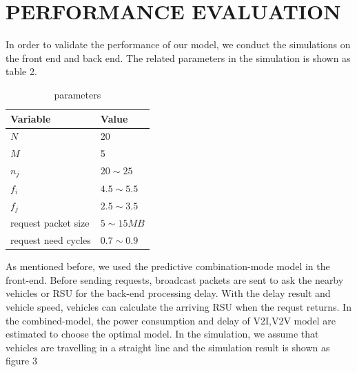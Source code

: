 \documentclass[journal]{IEEEtran}
\begin{document}
\section{PERFORMANCE EVALUATION}
In order to validate the performance of our model, we conduct the simulations on the front end and back end. The related parameters in the simulation is shown as table 2.
\begin{table}[h]
	\centering
	\begin{tabular}{p{3cm}p{3cm}}
	\hline
	Variable & Value \\\hline   
	$N$             & 20\\
	$M$             & 5\\
	$n_j$           & $20\sim25$ \\
	$f_i$           & $4.5\sim5.5$ \\
	$f_j$           & $2.5\sim3.5$ \\
	request packet size & $5\sim15MB$ \\
	request need cycles & $0.7\sim0.9$ \\\hline
	\end{tabular}
	\caption{parameters}
\end{table}

As mentioned before, we used the predictive combination-mode model in the front-end. Before sending requests, broadcast packets are sent to ask the nearby vehicles or RSU for the back-end processing delay. With the delay result and vehicle speed, vehicles can calculate the arriving RSU when the requst returns. In the combined-model, the power consumption and delay of V2I,V2V model are estimated to choose the optimal model. In the simulation, we assume that vehicles are travelling in a straight line and the simulation result is shown as figure 3

\begin{figure}[ht] 
  \centering 
  \caption{} 
\end{figure}
\end{document}
